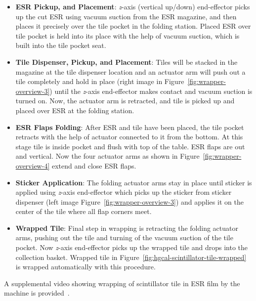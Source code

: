 \begin{itemize}
  \item \textbf{ESR Pickup, and Placement}: \textit{z}-axis (vertical up/down) end-effector
        picks up the cut \gls{ESR} using vacuum suction from the \gls{ESR} magazine,
        and then places it precisely over the tile pocket in the folding station.
        Placed \gls{ESR} over tile pocket is held into its place with
        the help of vacuum suction, which is built into the tile pocket
        seat.
  \item \textbf{Tile Dispenser, Pickup, and Placement}:
        Tiles will be stacked in the magazine at the tile dispenser
        location and an actuator arm will push out a tile
        completely and hold in place (right image in Figure~\ref{fig:wrapper-overview-3}) until the \textit{z}-axis end-effector
        makes contact and vacuum suction is turned on. Now,
        the actuator arm is retracted, and tile is
        picked up and placed over \gls{ESR} at the folding station.
  \item \textbf{ESR Flaps Folding}:
        After \gls{ESR} and tile have been placed, the tile pocket
        retracts with the help of actuator connected to it from the bottom.
        At this stage tile is inside pocket and flush with top of the table.
        \gls{ESR} flaps are out and vertical.
        Now the four actuator arms as shown in Figure~\ref{fig:wrapper-overview-4}
        extend and close \gls{ESR} flaps.
  \item \textbf{Sticker Application}:
        The folding actuator arms stay in place until sticker is
        applied using \textit{z}-axis end-effector which
        picks up the sticker from sticker dispenser (left image Figure~\ref{fig:wrapper-overview-3}) and applies it on
        the center of the tile where all flap corners meet.
  \item \textbf{Wrapped Tile}:
        Final step in wrapping is retracting the folding actuator arms,
        pushing out the tile and turning of the vacuum suction of the tile pocket.
        Now \textit{z}-axis end-effector picks up the wrapped tile and
        drops into the collection basket.
        Wrapped tile in Figure~\ref{fig:hgcal-scintillator-tile-wrapped}
        is wrapped automatically with this procedure.
\end{itemize}

A supplemental video showing wrapping of scintillator tile in \gls{ESR} film by the machine
is provided~\cite{tile-wrapping}.

